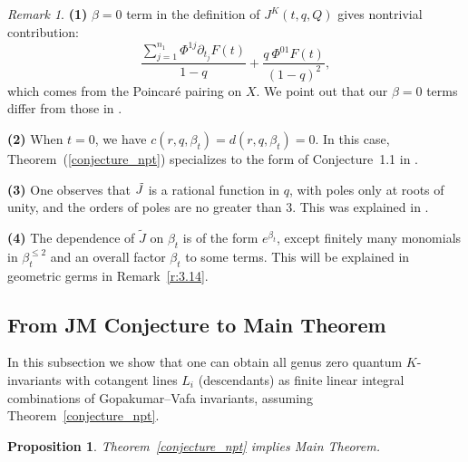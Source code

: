\documentclass[11pt]{amsart}
\newtheorem{proposition}[theorem]{Proposition}
\newtheorem*{main theorem*}{Main Theorem}
\theoremstyle{remark}
\newtheorem{remark}[theorem]{Remark}
\numberwithin{equation}{section}
\begin{document}
\begin{remark}
    \textbf{(1)} $\beta=0$ term in the definition of $J^K(t,q,Q)$ gives nontrivial contribution:
    \[
        \frac{ \sum_{j=1}^{n_1}\Phi^{1j} \partial_{t_j}F(t)  }{1-q} + \frac{q\ \Phi^{01} F(t)}{(1-q)^2},
    \]
    which comes from the Poincar\'e pairing on $X$. We point out that our $\beta=0$ terms differ from those in \cite{Jockers_Mayr_2019}.

    \textbf{(2)} When $t=0$, we have $c(r,q,\beta_t) = d(r,q,\beta_t)=0$. In this case, Theorem~(\ref{conjecture_npt}) specializes to the form of Conjecture~1.1 in \cite{Chou_Lee_2022_QKGVI}.

    \textbf{(3)} One observes that $\Tilde{J}$ is a rational function in $q$, with poles only at roots of unity, and the orders of poles are no greater than $3$. This was explained in \cite[Corollary~3.3]{Chou_Lee_2022_QKGVI}.

    \textbf{(4)} The dependence of $\tilde{J}$ on $\beta_t$ is of the form $e^{\beta_t}$, except finitely many monomials in $\beta_t^{\leq 2}$ and an overall factor $\beta_t$ to some terms. This will be explained in geometric germs in Remark~\ref{r:3.14}.
\end{remark}


\subsection{From JM Conjecture to Main Theorem}
In this subsection we show that one can obtain all genus zero quantum $K$-invariants with cotangent lines $L_i$ (descendants) as finite linear integral combinations of Gopakumar--Vafa invariants, assuming Theorem~\ref{conjecture_npt}.

\begin{proposition} \label{p:1.5}
Theorem~\ref{conjecture_npt} implies Main Theorem.
\end{proposition}
\end{document}
